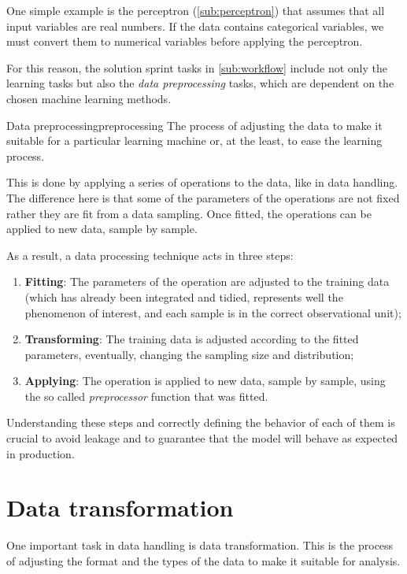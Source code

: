 One simple example is the perceptron (\cref{sub:perceptron}) that assumes that all
input variables are real numbers.  If the data contains categorical variables, we must
convert them to numerical variables before applying the perceptron.

For this reason, the solution sprint tasks in \cref{sub:workflow} include not only the
learning tasks but also the \emph{data preprocessing} tasks, which are dependent on the
chosen machine learning methods.

\begin{defbox}{Data preprocessing}{preprocessing}
  The process of adjusting the data to make it suitable for a particular learning machine
  or, at the least, to ease the learning process.
\end{defbox}

This is done by applying a series of operations to the data, like in data handling.  The
difference here is that some of the parameters of the operations are not fixed rather they
are fit from a data sampling.  Once fitted, the operations can be applied to
new data, sample by sample.

As a result, a data processing technique acts in three steps:
\begin{enumerate}
  \itemsep0em
  \item \textbf{Fitting}: The parameters of the operation are adjusted to the training
    data (which has already been integrated and tidied, represents well the phenomenon of
    interest, and each sample is in the correct observational unit);
  \item \textbf{Transforming}: The training data is adjusted according to the fitted
    parameters, eventually, changing the sampling size and distribution;
  \item \textbf{Applying}: The operation is applied to new data, sample by sample, using
    the so called \emph{preprocessor} function that was fitted.
\end{enumerate}

Understanding these steps and correctly defining the behavior of each of them is crucial
to avoid \gls{leakage} and to guarantee that the model will behave as expected in
production.

\section{Data transformation}

One important task in data handling is data transformation.  This is the process of adjusting
the format and the types of the data to make it suitable for analysis.

